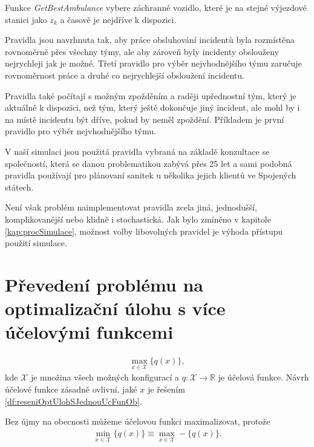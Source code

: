 \begin{definice}[GetBestAmbulance]
Funkce \textit{GetBestAmbulance}\label{df:getBestAmbulance} vybere záchranné vozidlo, které je na stejné výjezdové stanici jako $z_k$ a časově je nejdříve k dispozici.
\end{definice}

Pravidla jsou navrhnuta tak, aby práce obsluhování incidentů byla rozmístěna rovnoměrně přes všechny týmy, ale aby zároveň byly incidenty obslouženy nejrychleji jak je možné.
Třetí pravidlo pro výběr nejvhodnějšího týmu zaručuje rovnoměrnost práce a druhé co nejrychlejší obsloužení incidentu.

Pravidla také počítají s možným zpožděním a raději upřednostní tým, který je aktuálně k dispozici, než tým, který ještě dokončuje jiný incident, ale mohl by i na místě incidentu
být dříve, pokud by neměl zpoždění. Příkladem je první pravidlo pro výběr nejvhodnějšího týmu.

V naší simulaci jsou použitá pravidla vybraná na základě konzultace se společností, která se danou problematikou zabývá přes 25 let a sami podobná pravidla používají pro plánovaní sanitek
u několika jejich klientů ve Spojených státech.

Není však problém naimplementovat pravidla zcela jiná, jednodušší, komplikovanější nebo klidně i stochastická.
Jak bylo zmíněno v kapitole \ref{kap:procSimulace}, možnost volby libovolných pravidel je výhoda přístupu použití simulace.

\section{Převedení problému na optimalizační úlohu s více účelovými funkcemi}\label{kap:optUloha2uc}
\begin{definice}\label{df:optUloha1ucObecne}
  \begin{align}
    \max_{x \in \mathcal{X}} \{ q(x) \},
  \end{align}
  kde $\mathcal{X}$ je množina všech možných konfigurací a $q \colon \mathcal{X} \rightarrow \mathbb{R}$ je účelová funkce.
  Návrh účelové funkce zásadně ovlivní, jaké $x$ je řešením \ref{df:reseniOptUlohSJednouUcFunOb}.

  Bez újmy na obecnosti můžeme účelovou funkci maximalizovat, protože
  \begin{align*}
    \min_{x \in \mathcal{X}} \{ q(x) \} \equiv \max_{x \in \mathcal{X}} - \{ q(x) \}.
  \end{align*}
\end{definice}

